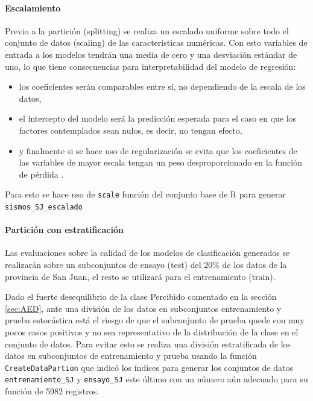 \documentclass[a4paper]{report}
\begin{document}
\paragraph{Escalamiento}
Previo a la partición (splitting) se realiza un escalado uniforme sobre todo el conjunto de datos (scaling) de las características numéricas.
Con esto variables de entrada a los modelos tendrán una media de cero y una desviación estándar de uno, lo que tiene consecuencias para interpretabilidad del modelo de regresión:
\begin{itemize}
	\item los coeficientes serán comparables entre sí, no dependiendo de la escala de los datos,
	\item el intercepto del modelo será la predicción esperada para el caso en que los factores contemplados sean nulos, es decir, no tengan efecto,
	\item y finalmente si se hace uso de regularización se evita que los coeficientes de las variables de mayor escala tengan un peso desproporcionado en la función de pérdida \cite[sección 3.4.1]{hastie_elements_2009}.
\end{itemize}
Para esto se hace uso de \verb'scale' función del conjunto base de R para generar \verb'sismos_SJ_escalado' 


\paragraph{Partición con estratificación}
Las evaluaciones sobre la calidad de los modelos de clasificación generados se realizarán sobre un subconjuntos de ensayo (test) del \(20 \%\) de los datos de la provincia de San Juan, el resto se utilizará para el entrenamiento (train).

Dado el fuerte desequilibrio de la clase Percibido comentado en la sección \ref{sec:AED}, ante una división de los datos en subconjuntos entrenamiento y prueba estocástica está el riesgo de que el subconjunto de prueba quede con muy pocos casos positivos y no sea representativo de la distribución de la clase en el conjunto de datos. 
Para evitar esto se realiza una división estratificada de los datos en subconjuntos de entrenamiento y prueba usando la función \verb'CreateDataPartion' que indicó los índices para generar los conjuntos de datos \verb'entrenamiento_SJ' y \verb'ensayo_SJ' este último con un número aún adecuado para su función de \num{5982} registros.
\end{document}
